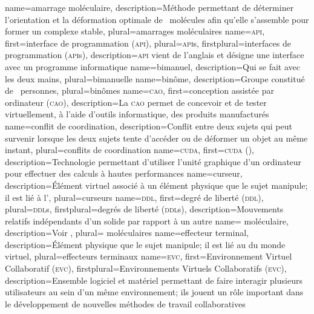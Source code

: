 %
{%
	name={amarrage moléculaire},%
	description={Méthode permettant de déterminer l'orientation et la déformation optimale de ~molécules afin qu'elle s'assemble pour former un complexe stable},%
	plural={amarrages moléculaires}%
}
%
{%
	name={\textsc{api}},%
	first={interface de programmation (\textsc{api})},%
	plural={\textsc{api}s},%
	firstplural={interfaces de programmation (\textsc{api}s)},%
	description={\textsc{api} vient de l'anglais  et désigne une interface avec un programme informatique}%
}
%
{%
	name={bimanuel},%
	description={Qui se fait avec les deux mains},%
	plural={bimanuelle}%
}
%
{%
	name={binôme},%
	description={Groupe constitué de ~personnes},%
	plural={binômes}%
}
%
{%
	name={\textsc{cao}},%
	first={conception assistée par ordinateur (\textsc{cao})},%
	description={La \textsc{cao} permet de concevoir et de tester virtuellement, à l'aide d'outils informatique, des produits manufacturés}%
}
%
{%
	name={conflit de coordination},%
	description={Conflit entre deux sujets qui peut survenir lorsque les deux sujets tente d'accéder ou de déformer un objet au même instant},%
	plural={conflits de coordination}%
}
%
{%
	name={\textsc{cuda}},%
	first={\textsc{cuda} ()},%
	description={Technologie permettant d'utiliser l'unité graphique d'un ordinateur pour effectuer des calculs à hautes performances}%
}
%
{%
	name={curseur},%
	description={Élément virtuel associé à un élément physique que le sujet manipule; il est lié à l'},%
	plural={curseurs}%
}
%
{%
	name={\textsc{ddl}},%
	first={degré de liberté (\textsc{ddl})},%
	plural={\textsc{ddl}s},%
	firstplural={degrés de liberté (\textsc{ddl}s)},%
	description={Mouvements relatifs indépendants d'un solide par rapport à un autre}%
}
%
{%
	name={ moléculaire},%
	description={Voir },%
	plural={ moléculaires}%
}
%
{%
	name={effecteur terminal},%
	description={Élément physique que le sujet manipule; il est lié au  du monde virtuel},%
	plural={effecteurs terminaux}%
}
%
{%
	name={\textsc{evc}},%
	first={Environnement Virtuel Collaboratif (\textsc{evc})},%
	firstplural={Environnements Virtuels Collaboratifs (\textsc{evc})},%
	description={Ensemble logiciel et matériel permettant de faire interagir plusieurs utilisateurs au sein d'un même environnement; ils jouent un rôle important dans le développement de nouvelles méthodes de travail collaboratives}%
}
